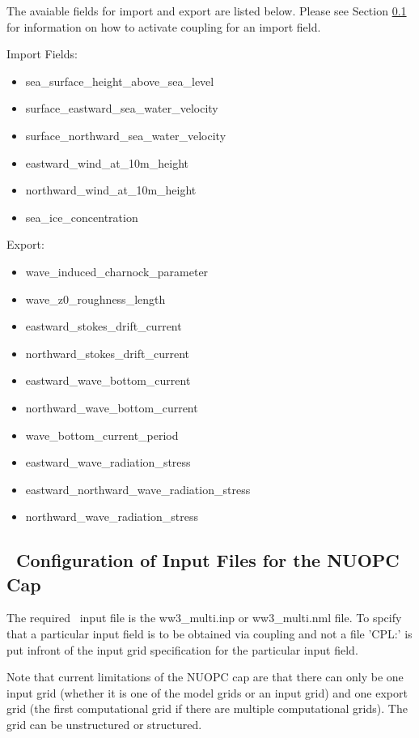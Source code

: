 The avaiable fields for import and export are listed below.  Please see Section \ref{sec:nuopcconfig} for 
information on how to activate coupling for an import field. 

\noindent Import Fields:
\begin{itemize} 
\item sea\_surface\_height\_above\_sea\_level
\item surface\_eastward\_sea\_water\_velocity
\item surface\_northward\_sea\_water\_velocity
\item eastward\_wind\_at\_10m\_height
\item northward\_wind\_at\_10m\_height
\item sea\_ice\_concentration
\end{itemize}

\noindent Export: 
\begin{itemize}
\item wave\_induced\_charnock\_parameter
\item wave\_z0\_roughness\_length
\item eastward\_stokes\_drift\_current
\item northward\_stokes\_drift\_current
\item eastward\_wave\_bottom\_current
\item northward\_wave\_bottom\_current
\item wave\_bottom\_current\_period
\item eastward\_wave\_radiation\_stress
\item eastward\_northward\_wave\_radiation\_stress
\item northward\_wave\_radiation\_stress
\end{itemize}


\vssub
\subsection{~Configuration of Input Files for the NUOPC Cap} \label{sec:nuopcconfig}
\vssub

The required \ws\ input file is the ww3\_multi.inp or ww3\_multi.nml file.  To spcify that a particular input field 
is to be obtained via coupling and not a file 'CPL:' is put infront of the input grid specification for the 
particular input field.  

Note that current limitations of the NUOPC cap are that there can only be one input grid (whether it is one of the 
model grids or an input grid) and one export grid (the first computational grid if there are multiple computational 
grids). The grid can be unstructured or structured. 

